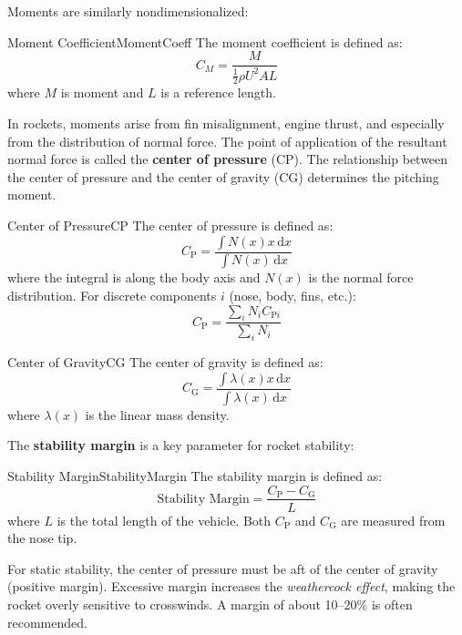 \documentclass[uplatex,dvipdfmx,a4j,11pt]{report}
\newcommand{\keyword}[1]{\textcolor{mainblue}{\textbf{#1}}}
\newcommand{\diff}{\mathrm{d}} %
\numberwithin{equation}{chapter}
\begin{document}
\enskip

Moments are similarly nondimensionalized:
\begin{definition}{Moment Coefficient}{MomentCoeff}{}
  The moment coefficient is defined as:
  \begin{equation}
    C_M = \frac{M}{\frac{1}{2}\rho U^{2}A L}
  \end{equation}
  where $M$ is moment and $L$ is a reference length.
\end{definition}

In rockets, moments arise from fin misalignment, engine thrust, and especially from the distribution of normal force. The point of application of the resultant normal force is called the \keyword{center of pressure} (CP). The relationship between the center of pressure and the center of gravity (CG) determines the pitching moment.
\begin{definition}{Center of Pressure}{CP}{}
  The center of pressure is defined as:
  \begin{equation}
    C_\mathrm{P} = \frac{\int N(x)x\,\diff x}{\int N(x)\,\diff x}
  \end{equation}
  where the integral is along the body axis and $N(x)$ is the normal force distribution. For discrete components $i$ (nose, body, fins, etc.):
  \begin{equation}
    C_\mathrm{P} = \frac{\sum_i N_i C_{\mathrm{P}i}}{\sum_i N_i}
  \end{equation}
\end{definition}

\begin{remark}{Center of Gravity}{CG}{}
  The center of gravity is defined as:
  \begin{equation}
    C_\mathrm{G} = \frac{\int \lambda(x)x\,\diff x}{\int \lambda(x)\,\diff x}
  \end{equation}
  where $\lambda(x)$ is the linear mass density.
\end{remark}

The \keyword{stability margin} is a key parameter for rocket stability:
\begin{definition}{Stability Margin}{StabilityMargin}{}
  The stability margin is defined as:
  \begin{equation}
    \text{Stability Margin} = \frac{C_\mathrm{P} - C_\mathrm{G}}{L}
  \end{equation}
  where $L$ is the total length of the vehicle. Both $C_\mathrm{P}$ and $C_\mathrm{G}$ are measured from the nose tip.
\end{definition}
For static stability, the center of pressure must be aft of the center of gravity (positive margin). Excessive margin increases the \emph{weathercock effect}, making the rocket overly sensitive to crosswinds. A margin of about 10--20\% is often recommended.
\end{document}
